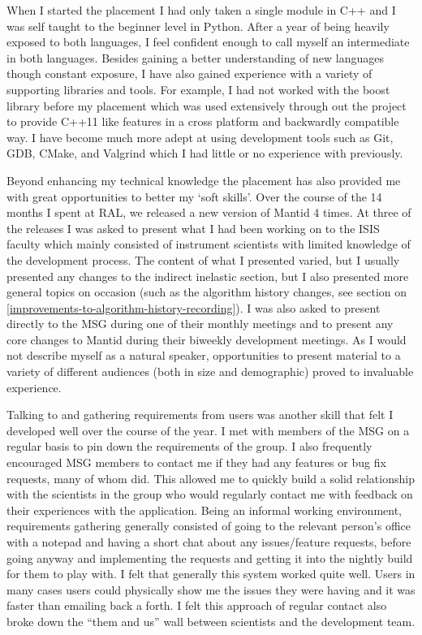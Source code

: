 \documentclass[paper=a4, fontsize=11pt]{scrartcl}	%
\numberwithin{equation}{section}															%
\numberwithin{figure}{section}																%
\numberwithin{table}{section}
\begin{document}
When I started the placement I had only taken a single module in C++ and
I was self taught to the beginner level in Python. After a year of being
heavily exposed to both languages, I feel confident enough to call
myself an intermediate in both languages. Besides gaining a better
understanding of new languages though constant exposure, I have also
gained experience with a variety of supporting libraries and tools. For
example, I had not worked with the boost library before my placement
which was used extensively through out the project to provide C++11 like
features in a cross platform and backwardly compatible way. I have become much more adept at using
development tools such as Git, GDB, CMake, and Valgrind which I had
little or no experience with previously.

Beyond enhancing my technical knowledge the placement has also provided
me with great opportunities to better my `soft skills'. Over the course
of the 14 months I spent at RAL, we released a new version of Mantid 4
times. At three of the releases I was asked to present what I had been
working on to the ISIS faculty which mainly consisted of instrument
scientists with limited knowledge of the development process. The content of what I presented varied, but I usually
presented any changes to the indirect inelastic section, but I also
presented more general topics on occasion (such as the algorithm history
changes, see section on
\ref{improvements-to-algorithm-history-recording}). I was also asked to present directly to
the MSG during one of their monthly meetings and to present any core
changes to Mantid during their biweekly development meetings. As I would
not describe myself as a natural speaker, opportunities to present
material to a variety of different audiences (both in size and
demographic) proved to invaluable experience.

Talking to and gathering requirements from users was another skill that
felt I developed well over the course of the year. I met with members of
the MSG on a regular basis to pin down the requirements of the group. I
also frequently encouraged MSG members to contact me if they had any
features or bug fix requests, many of whom did. This allowed me to
quickly build a solid relationship with the scientists in the group who
would regularly contact me with feedback on their experiences with the application. Being an informal working
environment, requirements gathering generally consisted of going to the relevant person's office with a notepad
and having a short chat about any issues/feature requests, before going
anyway and implementing the requests and getting it into the nightly
build for them to play with. I felt that generally this system worked
quite well. Users in many cases users could physically show me the
issues they were having and it was faster than emailing back a forth. I
felt this approach of regular contact also broke down the ``them and
us'' wall between scientists and the development team.
\end{document}
